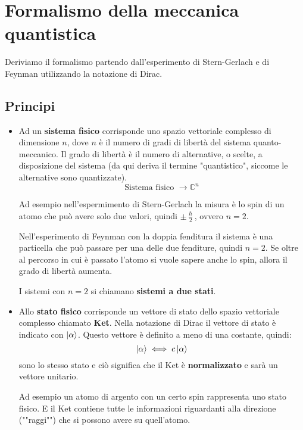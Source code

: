 \documentclass[a4paper]{article}
\begin{document}


\tableofcontents
\pagebreak

\section{Formalismo della meccanica quantistica}
Deriviamo il formalismo partendo dall'esperimento di Stern-Gerlach e di Feynman utilizzando la
notazione di Dirac.

\subsection{Principi}
\begin{itemize}
  \item Ad un \textbf{sistema fisico} corrisponde uno spazio vettoriale complesso
    di dimensione \( n \), dove \( n \) è il numero di gradi di libertà del sistema
    quanto-meccanico. Il grado di libertà è il numero di alternative, o scelte, a
    disposizione del sistema (da qui deriva il termine "quantistico", siccome le
    alternative sono quantizzate).
    \[
    \text{Sistema fisico } \to \mathbb{C}^n
    \] 

    \vspace{1em}
    \noindent
    Ad esempio nell'espermimento di Stern-Gerlach la misura è lo spin di un atomo
    che può avere solo due valori, quindi \( \pm \frac{\hslash}{2} \), ovvero \( n = 2 \).

    Nell'esperimento di Feynman con la doppia fenditura il sistema è una particella
    che può passare per una delle due fenditure, quindi \( n = 2 \).
    Se oltre al percorso in cui è passato l'atomo si vuole sapere anche lo spin, allora
    il grado di libertà aumenta.

    \vspace{1em}
    \noindent
    I sistemi con \( n = 2 \) si chiamano \textbf{sistemi a due stati}.

  \item Allo \textbf{stato fisico} corrisponde un vettore di stato dello spazio 
    vettoriale complesso chiamato \textbf{Ket}. Nella notazione di Dirac il vettore di
    stato è indicato con \( \ket{\alpha} \). Questo vettore è definito a meno di una 
    costante, quindi:
    \[
      \ket{\alpha} \iff c \ket{\alpha}
    \] 
    sono lo stesso stato e ciò significa che il Ket è \textbf{normalizzato} e sarà un 
    vettore unitario.

    \vspace{1em}
    \noindent
    Ad esempio un atomo di argento con un certo spin rappresenta uno stato fisico. E
    il Ket contiene tutte le informazioni riguardanti alla direzione (""raggi"") che si possono 
    avere su quell'atomo.


\end{itemize}
\end{document}
